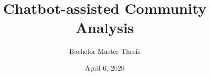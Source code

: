 \newcommand*{\BACHELOR}{}
\title{Chatbot-assisted Community Analysis}
\subtitle{\ifdefined\BACHELOR Bachelor \else Master \fi Thesis \ifdefined\PROPOSAL
		\PROPOSAL
	\fi}
\date{April 6, 2020}
\newcommand{\firstname}{Ben Aziz}
\newcommand{\lastname}{Lakhoune}
\newcommand{\matrNo}{380163}
\newcommand{\email}{ben.lakhoune@rwth-aachen.de}
\newcommand{\studyProgram}{\ifdefined\BACHELOR Bachelor \else Master \fi Computer Science}

\newcommand{\firstsupervisor}{PD Dr. Ralf Klamma}
\newcommand{\firstsupervisorchair}{Chair of Information Systems}
\newcommand{\firstsupervisoruniversity}{RWTH Aachen University}

\newcommand{\secondsupervisor}{Prof. Dr. Matthias Jarke}
\newcommand{\secondsupervisorchair}{Chair of Information Systems}
\newcommand{\secondsupervisoruniversity}{RWTH Aachen University}


\newcommand{\firstadvisor}{Alexander Neumann}
\newcommand{\firstadvisorchair}{Chair of Information Systems}
\newcommand{\firstadvisoruniversity}{RWTH Aachen University}

